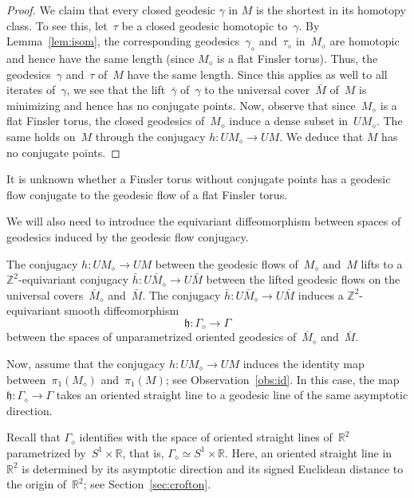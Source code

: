 \documentclass[AHL,Unicode,longabstracts,published]{cedram}
\newcommand{\Z}{\mathbb{Z}}
\newcommand{\R}{\mathbb{R}}
\newcommand{\bh}{\mathfrak{h}}
\begin{document}
\begin{proof}
We claim that every closed geodesic $\gamma$ in $M$ is the shortest in its homotopy class. To see this, let~$\tau$ be a closed geodesic homotopic to~$\gamma$. By Lemma~\ref{lem:isom}, the corresponding geodesics~$\gamma_{\diamond}$ and~$\tau_{\diamond}$ in~$M_{\diamond}$ are homotopic and hence have the same length (since $M_{\diamond}$ is a flat Finsler torus). Thus, the geodesics~$\gamma$ and~$\tau$ of~$M$ have the same length. Since this applies as well to all iterates of~$\gamma$, we see that the lift~$\bar{\gamma}$ of~$\gamma$ to the universal cover~$\bar{M}$ of~$M$ is minimizing and hence has no conjugate points. Now, observe that since~$M_{\diamond}$ is a flat Finsler torus, the closed geodesics of~$M_{\diamond}$ induce a dense subset in~$UM_{\diamond}$. The same holds on~$M$ through the conjugacy $h:UM_\diamond \to UM$. We deduce that $M$ has no conjugate points.
\end{proof}

\begin{rema}
It is unknown whether a Finsler torus without conjugate points has a geodesic flow conjugate to the geodesic flow of a flat Finsler torus.
\end{rema}

We will also need to introduce the equivariant diffeomorphism between spaces of geodesics induced by the geodesic flow conjugacy.

\begin{defi}\label{def:conjugacy}
The conjugacy $h:UM_\diamond \to UM$ between the geodesic flows of~$M_\diamond$ and~$M$ lifts to a $\Z^2$-equivariant conjugacy $\bar{h}:U\bar{M}_\diamond \to U\bar{M}$ between the lifted geodesic flows on the universal covers~$\bar{M}_\diamond$ and~$\bar{M}$. The conjugacy $\bar{h}:U\bar{M}_\diamond \to U\bar{M}$ induces a $\Z^2$-equivariant smooth diffeomorphism
\[
\bh:\Gamma_\diamond \to \Gamma
\]
between the spaces of unparametrized oriented geodesics of~$\bar{M}_\diamond$ and~$\bar{M}$.
\end{defi}

Now, assume that the conjugacy $h:UM_\diamond \to UM$ induces the identity map between~$\pi_1(M_\diamond)$ and~$\pi_1(M)$; see Observation~\ref{obs:id}. In this case, the map $\bh:\Gamma_\diamond \to \Gamma$ takes an oriented straight line to a geodesic line of the same asymptotic direction.

Recall that $\Gamma_\diamond$ identifies with the space of oriented straight lines of~$\R^2$ parametrized by~$S^1 \times \R$, that is, $\Gamma_\diamond \simeq S^1 \times \R$. Here, an oriented straight line in~$\R^2$ is determined by its asymptotic direction and its signed Euclidean distance to the origin of~$\R^2$; see Section~\ref{sec:crofton}.
\end{document}
